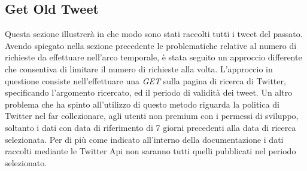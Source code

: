 \subsection{Get Old Tweet}
Questa sezione illustrerà in che modo sono stati raccolti tutti i tweet del passato. Avendo spiegato nella sezione precedente le problematiche relative al numero di richieste da effettuare nell'arco temporale, è stata seguito un approccio differente che consentiva di limitare il numero di richieste alla volta.
L'approccio in questione consiste nell'effettuare una \textit{GET} sulla pagina di ricerca di Twitter, specificando l'argomento ricercato, ed il periodo di validità dei tweet.
Un altro problema che ha spinto all'utilizzo di questo metodo riguarda la politica di Twitter nel far collezionare, agli utenti non premium con i permessi di sviluppo, soltanto i dati con data di riferimento di 7 giorni precedenti alla data di ricerca selezionata. Per di più come indicato all'interno della documentazione i dati raccolti mediante le Twitter Api non saranno tutti quelli pubblicati nel periodo selezionato.

